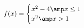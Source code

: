 \documentclass[preview]{standalone}
\begin{document}
\begin{align*}
f(x)=\begin{cases} x^2-4 \amp x \leq 1 \\ x^2 \amp x > 1 \end{cases}
\end{align*}
\end{document}
